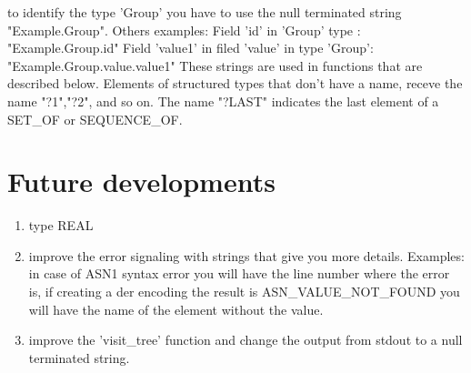 \documentclass{book}
\begin{document}
to identify the type 'Group' you have to use the null terminated string "Example.Group".
Others examples:
Field 'id' in 'Group' type :  "Example.Group.id"
Field 'value1' in filed 'value' in type 'Group':   "Example.Group.value.value1" 
These strings are used in functions that are described below.
Elements of structured types that don't have a name, receve the name "?1","?2", and so on. 
The name "?LAST" indicates the last element of a SET\_OF or SEQUENCE\_OF.

\section{Future developments}
\begin{enumerate}
\item type REAL 
\item improve the error signaling with strings that give you more details. 
   Examples: in case of ASN1 syntax error you will have the line number where the error is,  
             if creating a der encoding the result is ASN\_VALUE\_NOT\_FOUND you will have the
             name of the element without the value.
\item improve the 'visit\_tree' function and change the output from stdout to a null terminated 
   string.  

\end{enumerate}




\end{document}
